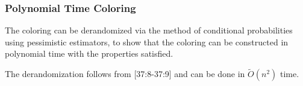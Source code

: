 \subsubsection{Polynomial Time Coloring}
The coloring can be derandomized via the method of conditional probabilities
using pessimistic estimators, to show that the coloring can be constructed in
polynomial time with the properties satisfied.


The derandomization follows from \cite{compactNameIndepRouting}[37:8-37:9] and
can be done in $\tilde{O}(n^2)$ time.




